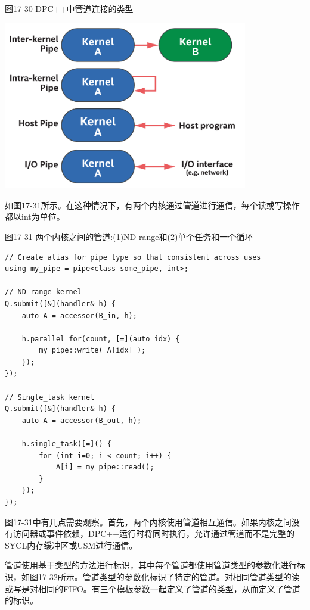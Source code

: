 \hspace*{\fill} \par %
图17-30 DPC++中管道连接的类型
\begin{center}
	\includegraphics[width=0.8\textwidth]{content/chapter-17/images/25}
\end{center}

如图17-31所示。在这种情况下，有两个内核通过管道进行通信，每个读或写操作都以int为单位。\par

\hspace*{\fill} \par %
图17-31 两个内核之间的管道:(1)ND-range和(2)单个任务和一个循环
\begin{lstlisting}[caption={}]
// Create alias for pipe type so that consistent across uses
using my_pipe = pipe<class some_pipe, int>;

// ND-range kernel
Q.submit([&](handler& h) {
	auto A = accessor(B_in, h);
	
	h.parallel_for(count, [=](auto idx) {
		my_pipe::write( A[idx] );
	});
});

// Single_task kernel
Q.submit([&](handler& h) {
	auto A = accessor(B_out, h);
	
	h.single_task([=]() {
		for (int i=0; i < count; i++) {
			A[i] = my_pipe::read();
		}
	});
});
\end{lstlisting}

图17-31中有几点需要观察。首先，两个内核使用管道相互通信。如果内核之间没有访问器或事件依赖，DPC++运行时将同时执行，允许通过管道而不是完整的SYCL内存缓冲区或USM进行通信。\par

管道使用基于类型的方法进行标识，其中每个管道都使用管道类型的参数化进行标识，如图17-32所示。管道类型的参数化标识了特定的管道。对相同管道类型的读或写是对相同的FIFO。有三个模板参数一起定义了管道的类型，从而定义了管道的标识。\par

